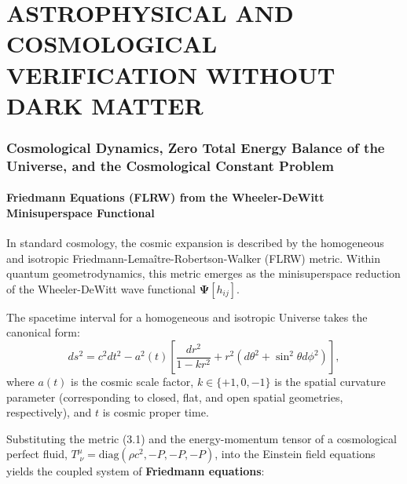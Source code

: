 \part{ASTROPHYSICAL AND COSMOLOGICAL VERIFICATION WITHOUT DARK MATTER}\label{part:3}

\section{Cosmological Dynamics, Zero Total Energy Balance of the Universe, and the Cosmological Constant Problem}\label{sec:rozdil3}

\subsection{Friedmann Equations (FLRW) from the Wheeler-DeWitt Minisuperspace Functional}\label{sec:3.1}

In standard cosmology, the cosmic expansion is described by the homogeneous and isotropic Friedmann-Lema\^{i}tre-Robertson-Walker (FLRW) metric. Within quantum geometrodynamics, this metric emerges as the minisuperspace reduction of the Wheeler-DeWitt wave functional $\mathbf{\Psi}[h_{ij}]$.

The spacetime interval for a homogeneous and isotropic Universe takes the canonical form:
\begin{equation}\label{eq:3.1}\tag{3.1}
ds^2 = c^2 dt^2 - a^2(t) \left[ \frac{dr^2}{1 - k r^2} + r^2 (d\theta^2 + \sin^2\theta d\phi^2) \right],
\end{equation}
where $a(t)$ is the cosmic scale factor, $k \in \{+1, 0, -1\}$ is the spatial curvature parameter (corresponding to closed, flat, and open spatial geometries, respectively), and $t$ is cosmic proper time.

Substituting the metric (3.1) and the energy-momentum tensor of a cosmological perfect fluid, $T^\mu_{\;\nu} = \text{diag}(\rho c^2, -P, -P, -P)$, into the Einstein field equations yields the coupled system of \textbf{Friedmann equations}:

